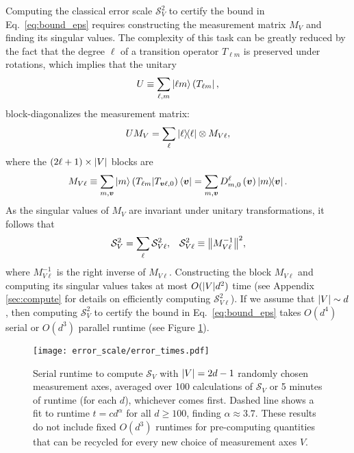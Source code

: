 \documentclass[notitlepage,twocolumn]{revtex4-2}
\newcommand{\p}[1]{\left(#1\right)} %
\renewcommand{\v}{\bm} %
\renewcommand{\S}{\mathcal{S}}
\def\obra#1{\mathinner{({#1}|}}
\def\obk#1{\mathinner{({#1})}}
\begin{document}
Computing the classical error scale $\S_V^2$ to certify the bound in Eq.~\eqref{eq:bound_eps} requires constructing the measurement matrix $M_V$ and finding its singular values.
The complexity of this task can be greatly reduced by the fact that the degree $\ell$ of a transition operator $T_{\ell m}$ is preserved under rotations, which implies that the unitary
\begin{align}
  U \equiv \sum_{\ell,m} \ket{\ell m} \obra{T_{\ell m}},
\end{align}
block-diagonalizes the measurement matrix:
\begin{align}
  U M_V = \sum_\ell \op{\ell} \otimes M_{V\ell},
\end{align}
where the $\p{2\ell+1}\times\abs{V}$ blocks are
\begin{align}
  M_{V\ell} \equiv \sum_{m,\v v} \ket{m} \obk{T_{\ell m}|T_{\v v\ell,0}} \bra{\v v}
  = \sum_{m,\v v} D^\ell_{m,0}\p{\v v} \op{m}{\v v}.
\end{align}
As the singular values of $M_V$ are invariant under unitary transformations, it follows that
\begin{align}
  \S_V^2 = \sum_\ell \S_{V\ell}^2,
  &&
  \S_{V\ell}^2 \equiv \norm{M_{V\ell}^{-1}}^2,
\end{align}
where $M_{V\ell}^{-1}$ is the right inverse of $M_{V\ell}$.
Constructing the block $M_{V\ell}$ and computing its singular values takes at most $O(\abs{V}d^2)$ time (see Appendix \ref{sec:compute} for details on efficiently computing $\S_{V\ell}^2$).
If we assume that $\abs{V}\sim d$, then computing $\S_V^2$ to certify the bound in Eq.~\eqref{eq:bound_eps} takes $O(d^4)$ serial or $O(d^3)$ parallel runtime (see Figure \ref{fig:times}).

\begin{figure}
  \centering
  \texttt{[image: error\_scale/error\_times.pdf]}
  \caption{Serial runtime to compute $\S_V$ with $\abs{V}=2d-1$ randomly chosen measurement axes, averaged over 100 calculations of $\S_V$ or 5 minutes of runtime (for each $d$), whichever comes first.
    Dashed line shows a fit to runtime $t=c d^\alpha$ for all $d\ge100$, finding $\alpha\approx 3.7$.
    These results do not include fixed $O(d^3)$ runtimes for pre-computing quantities that can be recycled for every new choice of measurement axes $V$.}
  \label{fig:times}
\end{figure}
\end{document}
